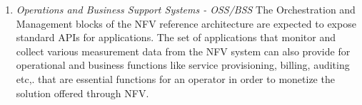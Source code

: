 \begin{enumerate}
    \item \textit{Operations and Business Support Systems - OSS/BSS}
        The Orchestration and Management blocks of the NFV reference architecture are expected to expose standard APIs for applications. The set of applications that monitor and collect various measurement data from the NFV system can also provide for operational and business functions like service provisioning, billing, auditing etc,. that are essential functions for an operator in order to monetize the solution offered through NFV.

\end{enumerate}
